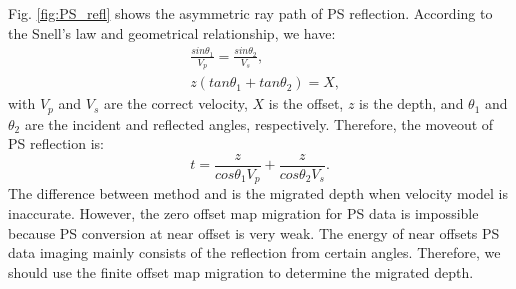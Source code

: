 \documentclass[extra,mreferee]{gji}
\newcommand{\Rome}[1]{{\bf\uppercase\expandafter{\romannumeral #1\relax}}}
\begin{document}
Fig. \ref{fig:PS_refl} shows the asymmetric ray path of PS reflection.
According to the Snell's law and geometrical relationship, we have:
\begin{equation}
\begin{split}
    &\frac{sin\theta_1}{V_p}=\frac{sin\theta_2}{V_s},\\
	&z(tan\theta_1+tan\theta_2)=X,
\end{split}
    \label{eq:Snell_PS} 
\end{equation}
with $V_p$ and $V_s$ are the correct velocity, $X$ is the offset, $z$ is the depth, 
and $\theta_1$ and $\theta_2$ are the incident and reflected angles, respectively.
Therefore, the moveout of PS reflection is:
\begin{equation}
	t=\frac{z}{cos\theta_1V_p}+\frac{z}{cos\theta_2V_s}.
    \label{eq:TravelTime_PS} 
\end{equation}
The difference between method \Rome{1} and \Rome{2} 
is the migrated depth when velocity model is inaccurate. 
However, the zero offset map migration for PS data is impossible because PS conversion
at near offset is very weak. The energy of near offsets PS data imaging mainly consists of
the reflection from certain angles. Therefore, we should use the finite offset map
migration to determine the migrated depth. 
\end{document}
